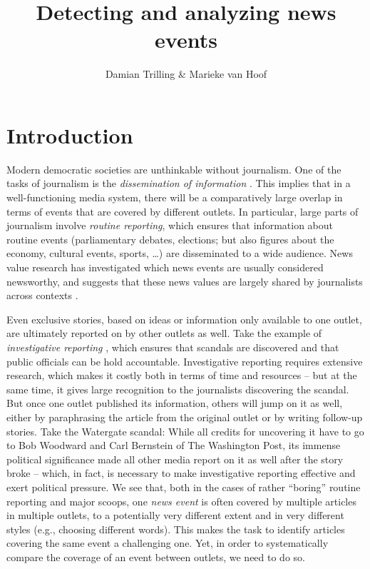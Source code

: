 \documentclass[a4paper,man,natbib,floatsintext,mask]{apa6}
\title{Detecting and analyzing news events}
\author{Damian Trilling \& Marieke van Hoof}
\affiliation{University of Amsterdam}
\begin{document}
\maketitle

\section{Introduction}
Modern democratic societies are unthinkable without journalism. %
One of the tasks of journalism is the \emph{dissemination of information} \citep[e.g.,][]{Beam2009}.
This implies that in a well-functioning media system, there will be a comparatively large overlap in terms of events that are covered by different outlets.
In particular, large parts of journalism involve \emph{routine reporting}, which ensures that information about routine events (parliamentary debates, elections; but also figures about the economy, cultural events, sports, \ldots) are disseminated to a wide audience.
News value research has investigated which news events are usually considered newsworthy, and suggests that these news values are largely shared by journalists across contexts \citep[e.g.,][]{Eilders2006,Harcup2016}.

Even exclusive stories, based on ideas or information only available to one outlet, are ultimately reported on by other outlets as well.
Take the example of \emph{investigative reporting} \citep[see, e.g.,][]{deburgh2008}, which ensures that scandals are discovered and that public officials can be hold accountable.
Investigative reporting requires extensive research, which makes it costly both in terms of time and resources -- but at the same time, it gives large recognition to the journalists discovering the scandal.
But once one outlet published its information, others will jump on it as well, either by paraphrasing the article from the original outlet or by writing follow-up stories.
Take the Watergate scandal: While all credits for uncovering it have to go to Bob Woodward and Carl Bernstein of The Washington Post, its immense political significance made all other media report on it as well after the story broke -- which, in fact, is necessary to make investigative reporting effective and exert political pressure.
We see that, both in the cases of rather ``boring'' routine reporting and major scoops, one \emph{news event} is often covered by multiple articles in multiple outlets, to a potentially very different extent and in very different styles (e.g., choosing different words).
This makes the task to identify articles covering the same event a challenging one.
Yet, in order to systematically compare the coverage of an event between outlets, we need to do so.
\end{document}
